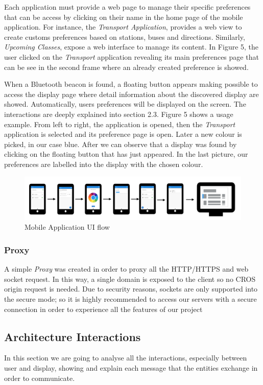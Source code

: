 \documentclass[]{usiinfbachelorproject}
\begin{document}
Each application must provide a web page to manage their specific preferences that can be access by clicking on their name in the home page of the mobile application. For instance, the \emph{Transport Application}, provides a web view to create customs preferences based on stations, buses and directions. Similarly, \emph{Upcoming Classes}, expose a web interface to manage its content. In Figure 5, the user clicked on the \emph{Transport} application revealing its main preferences page that can be see in the second frame where an already created preference is showed.

When a Bluetooth beacon is found, a floating button appears making possible to access the display page where detail information about the discovered display are showed. Automatically, users preferences will be displayed on the screen. The interactions are deeply explained into section 2.3. Figure 5 shows a usage example. From left to right, the application is opened, then the \emph{Transport} application is selected and its preference page is open. Later a new colour is picked, in our case blue. After we can observe that a display was found by clicking on the floating button that has just appeared. In the last picture, our preferences are labelled into the display with the chosen colour.
\begin{figure}[H]
  \centering
  \includegraphics[width=1\textwidth]{./images/UI_flow.png}
   \caption{Mobile Application UI flow}

\end{figure}

\subsubsection{Proxy}
A simple \emph{Proxy} was created in order to proxy all the HTTP/HTTPS and web socket request. In this way, a single domain is exposed to the client so no CROS origin request is needed. Due to security reasons, sockets are only supported into the secure mode; so it is highly recommended to access our servers with a secure connection in order to experience all the features of our project
 
\subsection{Architecture Interactions}
In this section we are going to analyse all the interactions, especially between user and display, showing and explain each message that the entities exchange in order to communicate.
\end{document}
